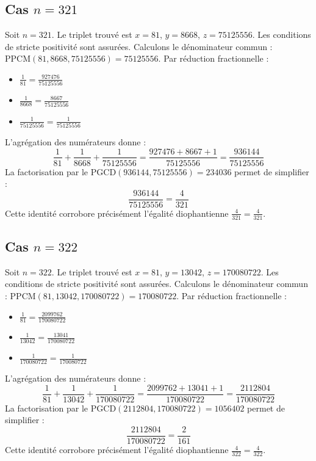 \documentclass[11pt,a4paper]{article}
\begin{document}
\subsection{Cas $n = 321$}
Soit $n = 321$. Le triplet trouvé est $x = 81$, $y = 8668$, $z = 75125556$.
Les conditions de stricte positivité sont assurées.
Calculons le dénominateur commun : $\text{PPCM}(81, 8668, 75125556) = 75125556$.
Par réduction fractionnelle :
\begin{itemize}
    \item $\frac{1}{81} = \frac{927476}{75125556}$
    \item $\frac{1}{8668} = \frac{8667}{75125556}$
    \item $\frac{1}{75125556} = \frac{1}{75125556}$
\end{itemize}
L'agrégation des numérateurs donne :
$$ \frac{1}{81} + \frac{1}{8668} + \frac{1}{75125556} = \frac{927476 + 8667 + 1}{75125556} = \frac{936144}{75125556} $$
La factorisation par le $\text{PGCD}(936144, 75125556) = 234036$ permet de simplifier :
$$ \frac{936144}{75125556} = \frac{4}{321} $$
Cette identité corrobore précisément l'égalité diophantienne $\frac{4}{321} = \frac{4}{321}$.

\subsection{Cas $n = 322$}
Soit $n = 322$. Le triplet trouvé est $x = 81$, $y = 13042$, $z = 170080722$.
Les conditions de stricte positivité sont assurées.
Calculons le dénominateur commun : $\text{PPCM}(81, 13042, 170080722) = 170080722$.
Par réduction fractionnelle :
\begin{itemize}
    \item $\frac{1}{81} = \frac{2099762}{170080722}$
    \item $\frac{1}{13042} = \frac{13041}{170080722}$
    \item $\frac{1}{170080722} = \frac{1}{170080722}$
\end{itemize}
L'agrégation des numérateurs donne :
$$ \frac{1}{81} + \frac{1}{13042} + \frac{1}{170080722} = \frac{2099762 + 13041 + 1}{170080722} = \frac{2112804}{170080722} $$
La factorisation par le $\text{PGCD}(2112804, 170080722) = 1056402$ permet de simplifier :
$$ \frac{2112804}{170080722} = \frac{2}{161} $$
Cette identité corrobore précisément l'égalité diophantienne $\frac{4}{322} = \frac{4}{322}$.
\end{document}
